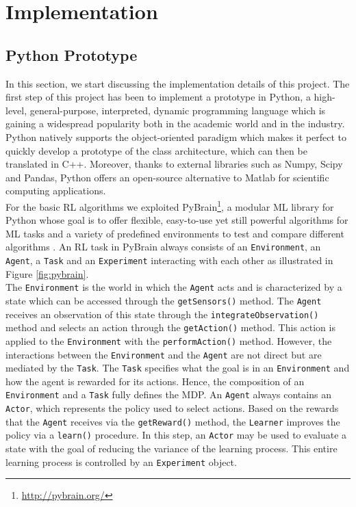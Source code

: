 \chapter{Implementation}

\section{Python Prototype}
\label{sec:python_prototype}

In this section, we start discussing the implementation details of this project. 
The first step of this project has been to implement a prototype in Python, a high-level, general-purpose, interpreted, dynamic programming language which is gaining a widespread popularity both in the academic world and in the industry. Python natively supports the object-oriented paradigm which makes it perfect to quickly develop a prototype of the class architecture, which can then be translated in C++. Moreover, thanks to external libraries such as Numpy, Scipy and Pandas, Python offers an open-source alternative to Matlab for scientific computing applications.\\
For the basic RL algorithms we exploited PyBrain\footnote{\url{http://pybrain.org/}}, a modular ML library for Python whose goal is to offer flexible, easy-to-use yet still powerful algorithms for ML tasks and a variety of predefined environments to test and compare different algorithms \cite{pybrain2010jmlr}. An RL task in PyBrain always consists of an \lstinline{Environment}, an \lstinline{Agent}, a \lstinline{Task} and an \lstinline{Experiment} interacting with each other as illustrated in Figure \ref{fig:pybrain}.\\
The \lstinline{Environment} is the world in which the \lstinline{Agent} acts and is characterized by a state which can be accessed through the \lstinline{getSensors()} method. The \lstinline{Agent} receives an observation of this state through the \lstinline{integrateObservation()} method and selects an action through the \lstinline{getAction()} method. This action is applied to the \lstinline{Environment} with the \lstinline{performAction()} method. However, the interactions between the \lstinline{Environment} and the \lstinline{Agent} are not direct but are mediated by the \lstinline{Task}. The \lstinline{Task} specifies what the goal is in an \lstinline{Environment} and how the agent is rewarded for its actions. Hence, the composition of an \lstinline{Environment} and a \lstinline{Task} fully defines the MDP. An \lstinline{Agent} always contains an \lstinline{Actor}, which represents the policy used to select actions. Based on the rewards that the \lstinline{Agent} receives via the \lstinline{getReward()} method, the \lstinline{Learner} improves the policy via a \lstinline{learn()} procedure. In this step, an \lstinline{Actor} may be used to evaluate a state with the goal of reducing the variance of the learning process. This entire learning process is controlled by an \lstinline{Experiment} object.\\ 
